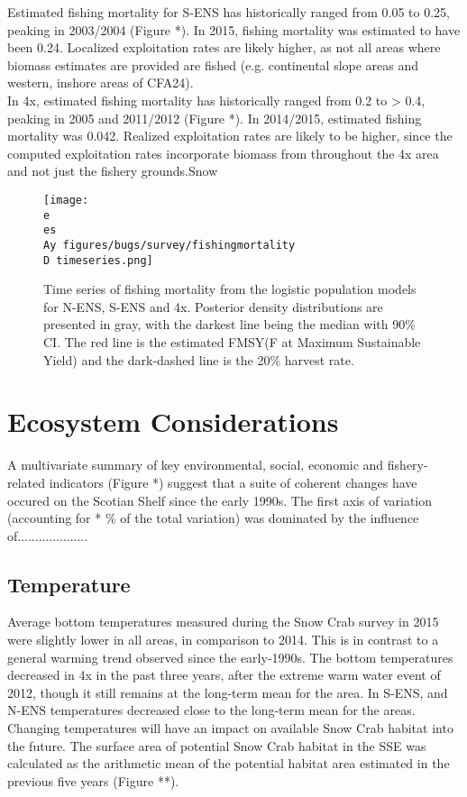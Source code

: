 \documentclass[paper=a4, fontsize=11pt]{article}
\newcommand{\D}{.}
\newcommand{\e}{/home/michelle/ecomod_data/}
\newcommand{\es}{snowcrab/}
\newcommand{\Ay}{assessments/2015/}
\begin{document}
Estimated fishing mortality for S-ENS has historically ranged from 0.05 to 0.25, peaking in 2003/2004 (Figure *). In 2015, fishing mortality was estimated to have been 0.24. Localized exploitation rates are likely higher, as not all areas where biomass estimates are provided are fished (e.g. continental slope areas and western, inshore areas of CFA24).\\

In 4x, estimated fishing mortality has historically ranged from 0.2 to > 0.4, peaking in 2005 and 
2011/2012 (Figure *). In 2014/2015, estimated fishing mortality was 0.042. Realized exploitation rates are likely to be higher, since the computed exploitation rates incorporate biomass from throughout the 4x area and not just the fishery grounds.Snow

\begin{figure}[ht]
    \centering
    \texttt{[image: \\e \\es \\Ay figures/bugs/survey/fishingmortality\\D timeseries.png]}
    \caption{Time series of fishing mortality from the logistic population models for N-ENS, S-ENS and 4x. Posterior density distributions are presented in gray, with the darkest line being the median with 90\% CI. The red line is the estimated FMSY(F at Maximum Sustainable Yield) and the dark-dashed line is the 20\% harvest rate.}
\end{figure}
\clearpage

\section{Ecosystem Considerations}
A multivariate summary of key environmental, social, economic and fishery-related indicators (Figure *) suggest that a suite of coherent changes have occured on the Scotian Shelf since the early 1990s. The first axis of variation (accounting for * \% of the total variation) was dominated by the influence of....................

\subsection{Temperature}
Average bottom temperatures measured during the Snow Crab survey in 2015 were slightly lower in all areas, in comparison to 2014. This is in contrast to a general warming trend observed since the early-1990s. The bottom temperatures decreased in 4x in the past three years, after the extreme warm water event of 2012, though it still remains at the long-term mean for the area. In S-ENS, and N-ENS temperatures decreased close to the long-term mean for the areas. Changing temperatures will have an impact on available Snow Crab habitat into the future. The surface area of potential Snow Crab habitat in the SSE was calculated as the arithmetic mean of the potential habitat area estimated in the previous five years (Figure **). 
\end{document}
